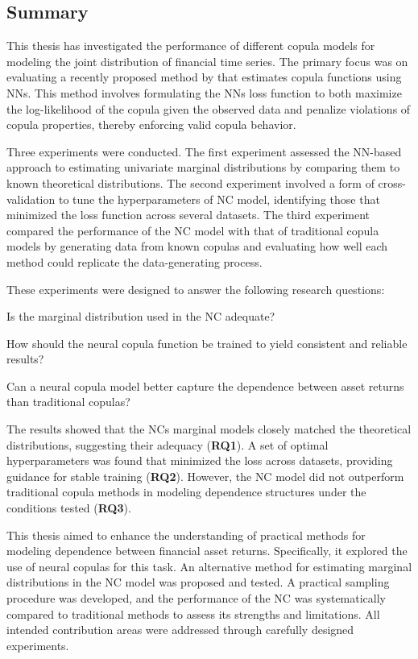 \subsection{Summary}
This thesis has investigated the performance of different copula models for modeling the joint distribution of financial time series. The primary focus was on evaluating a recently proposed method by \citet[postnote]{ZengWang2022} that estimates copula functions using \gls{NN}s. This method involves formulating the \gls{NN}s loss function to both maximize the log-likelihood of the copula given the observed data and penalize violations of copula properties, thereby enforcing valid copula behavior.

Three experiments were conducted. The first experiment assessed the \gls{NN}-based approach to estimating univariate marginal distributions by comparing them to known theoretical distributions. The second experiment involved a form of cross-validation to tune the hyperparameters of \gls{NC} model, identifying those that minimized the loss function across several datasets. The third experiment compared the performance of the \gls{NC} model with that of traditional copula models by generating data from known copulas and evaluating how well each method could replicate the data-generating process. 

These experiments were designed to answer the following research questions:

\begin{compactenum}[{\bfseries RQ}1]
    \item Is the marginal distribution used in the \gls{NC} adequate?
    \item How should the neural copula function be trained to yield consistent and reliable results?
    \item Can a neural copula model better capture the dependence between asset returns than traditional copulas?
\end{compactenum}

The results showed that the \gls{NC}s marginal models closely matched the theoretical distributions, suggesting their adequacy (\textbf{RQ1}). A set of optimal hyperparameters was found that minimized the loss across datasets, providing guidance for stable training (\textbf{RQ2}). However, the \gls{NC} model did not outperform traditional copula methods in modeling dependence structures under the conditions tested (\textbf{RQ3}).

This thesis aimed to enhance the understanding of practical methods for modeling dependence between financial asset returns. Specifically, it explored the use of neural copulas for this task. An alternative method for estimating marginal distributions in the \gls{NC} model was proposed and tested. A practical sampling procedure was developed, and the performance of the \gls{NC} was systematically compared to traditional methods to assess its strengths and limitations. All intended contribution areas were addressed through carefully designed experiments.

